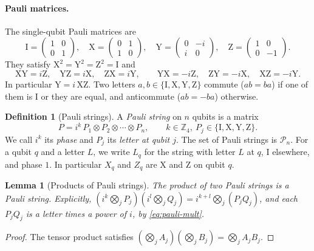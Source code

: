 \documentclass[11pt]{article}
\newtheorem{lemma}[theorem]{Lemma}
\theoremstyle{definition}
\newtheorem{definition}[theorem]{Definition}
\theoremstyle{remark}
\newcommand{\Z}{\mathbb{Z}}
\newcommand{\Pauli}{\mathcal{P}_n}
\newcommand{\tI}{\mathrm{I}}
\newcommand{\tX}{\mathrm{X}}
\newcommand{\tY}{\mathrm{Y}}
\newcommand{\tZ}{\mathrm{Z}}
\begin{document}
\paragraph{Pauli matrices.}
The single-qubit Pauli matrices are
\[
  \tI = \begin{pmatrix} 1 & 0 \\ 0 & 1 \end{pmatrix},\quad
  \tX = \begin{pmatrix} 0 & 1 \\ 1 & 0 \end{pmatrix},\quad
  \tY = \begin{pmatrix} 0 & -i \\ i & 0 \end{pmatrix},\quad
  \tZ = \begin{pmatrix} 1 & 0 \\ 0 & -1 \end{pmatrix}.
\]
They satisfy $\tX^2 = \tY^2 = \tZ^2 = \tI$ and
\begin{equation}\label{eq:pauli-mult}
  \tX\tY = i\tZ,\quad \tY\tZ = i\tX,\quad \tZ\tX = i\tY,\qquad
  \tY\tX = -i\tZ,\quad \tZ\tY = -i\tX,\quad \tX\tZ = -i\tY.
\end{equation}
In particular $\tY = i\,\tX\tZ$. Two letters $a, b \in \{\tI,\tX,\tY,\tZ\}$ commute
($ab = ba$) if one of them is $\tI$ or they are equal, and anticommute ($ab = -ba$)
otherwise.

\begin{definition}[Pauli strings]
A \emph{Pauli string} on $n$ qubits is a matrix
\[
  P = i^k \, P_1 \otimes P_2 \otimes \cdots \otimes P_n,
  \qquad k \in \Z_4,\ P_j \in \{\tI,\tX,\tY,\tZ\}.
\]
We call $i^k$ its \emph{phase} and $P_j$ its \emph{letter at qubit $j$}. The set of Pauli
strings is $\Pauli$. For a qubit $q$ and a letter $L$, we write $L_q$ for the string with
letter $L$ at $q$, $\tI$ elsewhere, and phase $1$. In particular $X_q$ and $Z_q$ are
$\tX$ and $\tZ$ on qubit $q$.
\end{definition}

\begin{lemma}[Products of Pauli strings]\label{lem:pauli-product}
The product of two Pauli strings is a Pauli string. Explicitly,
$(i^k \bigotimes_j P_j)(i^l \bigotimes_j Q_j) = i^{k+l} \bigotimes_j (P_j Q_j)$, and each
$P_j Q_j$ is a letter times a power of $i$, by \eqref{eq:pauli-mult}.
\end{lemma}

\begin{proof}
The tensor product satisfies
$(\bigotimes_j A_j)(\bigotimes_j B_j) = \bigotimes_j A_j B_j$.
\end{proof}
\end{document}
